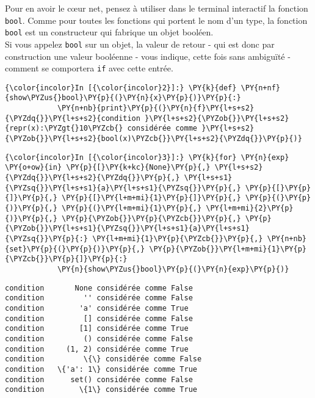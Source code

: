     Pour en avoir le cœur net, pensez à utiliser dans le terminal interactif
la fonction \texttt{bool}. Comme pour toutes les fonctions qui portent
le nom d'un type, la fonction \texttt{bool} est un constructeur qui
fabrique un objet booléen.\\

Si vous appelez \texttt{bool} sur un objet, la valeur de retour - qui
est donc par construction une valeur booléenne - vous indique, cette
fois sans ambiguïté - comment se comportera \texttt{if} avec cette
entrée.

    \begin{Verbatim}[commandchars=\\\{\}]
{\color{incolor}In [{\color{incolor}2}]:} \PY{k}{def} \PY{n+nf}{show\PYZus{}bool}\PY{p}{(}\PY{n}{x}\PY{p}{)}\PY{p}{:}
            \PY{n+nb}{print}\PY{p}{(}\PY{n}{f}\PY{l+s+s2}{\PYZdq{}}\PY{l+s+s2}{condition }\PY{l+s+s2}{\PYZob{}}\PY{l+s+s2}{repr(x):\PYZgt{}10\PYZcb{} considérée comme }\PY{l+s+s2}{\PYZob{}}\PY{l+s+s2}{bool(x)\PYZcb{}}\PY{l+s+s2}{\PYZdq{}}\PY{p}{)}
\end{Verbatim}


    \begin{Verbatim}[commandchars=\\\{\}]
{\color{incolor}In [{\color{incolor}3}]:} \PY{k}{for} \PY{n}{exp} \PY{o+ow}{in} \PY{p}{[}\PY{k+kc}{None}\PY{p}{,} \PY{l+s+s2}{\PYZdq{}}\PY{l+s+s2}{\PYZdq{}}\PY{p}{,} \PY{l+s+s1}{\PYZsq{}}\PY{l+s+s1}{a}\PY{l+s+s1}{\PYZsq{}}\PY{p}{,} \PY{p}{[}\PY{p}{]}\PY{p}{,} \PY{p}{[}\PY{l+m+mi}{1}\PY{p}{]}\PY{p}{,} \PY{p}{(}\PY{p}{)}\PY{p}{,} \PY{p}{(}\PY{l+m+mi}{1}\PY{p}{,} \PY{l+m+mi}{2}\PY{p}{)}\PY{p}{,} \PY{p}{\PYZob{}}\PY{p}{\PYZcb{}}\PY{p}{,} \PY{p}{\PYZob{}}\PY{l+s+s1}{\PYZsq{}}\PY{l+s+s1}{a}\PY{l+s+s1}{\PYZsq{}}\PY{p}{:} \PY{l+m+mi}{1}\PY{p}{\PYZcb{}}\PY{p}{,} \PY{n+nb}{set}\PY{p}{(}\PY{p}{)}\PY{p}{,} \PY{p}{\PYZob{}}\PY{l+m+mi}{1}\PY{p}{\PYZcb{}}\PY{p}{]}\PY{p}{:}
            \PY{n}{show\PYZus{}bool}\PY{p}{(}\PY{n}{exp}\PY{p}{)}
\end{Verbatim}


    \begin{Verbatim}[commandchars=\\\{\}]
condition       None considérée comme False
condition         '' considérée comme False
condition        'a' considérée comme True
condition         [] considérée comme False
condition        [1] considérée comme True
condition         () considérée comme False
condition     (1, 2) considérée comme True
condition         \{\} considérée comme False
condition   \{'a': 1\} considérée comme True
condition      set() considérée comme False
condition        \{1\} considérée comme True

    \end{Verbatim}

